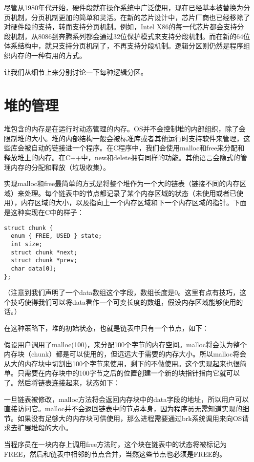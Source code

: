 \documentclass[cn,11pt,chinese]{elegantbook}
\begin{document}
尽管从1980年代开始，硬件段就在操作系统中广泛使用，现在已经基本被替换为分页机制，分页机制更加的简单和灵活。在新的芯片设计中，芯片厂商也已经移除了对硬件段的支持，转而支持分页机制。例如，Intel X86的每一代芯片都会支持分段机制，从8086到奔腾系列都会通过32位保护模式来支持分段机制。而在新的64位体系结构中，就只支持分页机制了，不再支持分段机制。逻辑分区则仍然是程序组织内存的一种有用的方式。

让我们从细节上来分别讨论一下每种逻辑分区。

\section{堆的管理}

堆包含的内存是在运行时动态管理的内存。OS并不会控制堆的内部组织，除了会限制堆的大小。堆的内部结构一般会被标准库或者其他运行时支持软件来管理，这些库会被自动的链接进一个程序。在C程序中，我们会使用malloc和free来分配和释放堆上的内存。在C++中，new和delete拥有同样的功能。其他语言会隐式的管理内存的分配和释放（垃圾收集）。

实现malloc和free最简单的方式是将整个堆作为一个大的链表（链接不同的内存区域）来处理。每个链表中的节点都记录了某个内存区域的状态（未使用或者已使用），内存区域的大小，以及指向上一个内存区域和下一个内存区域的指针。下面是这种实现在C中的样子：

\begin{verbatim}
struct chunk {
  enum { FREE, USED } state;
  int size;
  struct chunk *next;
  struct chunk *prev;
  char data[0];
};
\end{verbatim}

（注意到我们声明了一个data数组这个字段，数组长度是0。这里有点有技巧，这个技巧使得我们可以将data看作一个可变长度的数组，假设内存区域能够使用的话。）

在这种策略下，堆的初始状态，也就是链表中只有一个节点，如下：

假设用户调用了malloc(100)，来分配100个字节的内存空间。malloc将会认为整个内存块（chunk）都是可以使用的，但远远大于需要的内存大小。所以malloc将会从大的内存块中切割出100个字节来使用，剩下的不做使用。这个实现起来也很简单。只需要在内存块中的100字节之后的位置创建一个新的块指针指向它就可以了。然后将链表连接起来，状态如下：

一旦链表被修改，malloc方法将会返回内存块中的data字段的地址，所以用户可以直接访问它。malloc并不会返回链表中的节点本身，因为程序员无需知道实现的细节。如果没有足够大的内存块可供使用，那么进程需要通过brk系统调用来向OS请求去扩展堆段的大小。

当程序员在一块内存上调用free方法时，这个块在链表中的状态将被标记为FREE，然后和链表中相邻的节点合并，当然这些节点也必须是FREE的。
\end{document}
